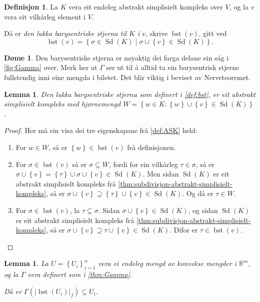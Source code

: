 \documentclass[a4paper, 12pt, norsk]{article}
\theoremstyle{plain}
\newtheorem{lemma}[theorem]{Lemma}
\theoremstyle{definition}
\newtheorem{definition}[theorem]{Definisjon}
\newtheorem{example}[theorem]{Døme}
\newcommand{\Rb}{\mathbb{R}}
\newcommand{\union}{ \mathop{\cup}\limits }
\newcommand{\gr}[1]{ \lvert #1 \rvert } %
\newcommand{\set}[1]{ \left\{ #1 \right\} } %
\DeclareMathOperator{\Sd}{Sd} %
\DeclareMathOperator{\bst}{bst} %
\begin{document}
\begin{definition} \label{def:bst}
	La \( K \) vera eit endeleg abstrakt simplisielt kompleks over \( V \), og la \( v \) vera eit vilkårleg element i \( V \).
	
	Då er \emph{den lukka barysentriske stjerna til \( K \) i \( v \)}, skrive \( \bst(v) \), gitt ved
	\[
		\bst(v) = \set{\sigma \in \Sd(K) \mid \sigma \union \set{v} \in \Sd(K)}.
	\]
\end{definition}

\begin{example}
	Den barysentriske stjerna er nøyaktig dei farga delane ein såg i \autoref{fig:Gamma} over. Merk her at \( \Gamma \) ser ut til å alltid ta ein barysentrisk stjerne fullstendig inni eine mengda i biletet. Det blir viktig i beviset av Nerveteoremet.
\end{example}

\begin{lemma} \label{thm:bst-ask}
	Den lukka barysentriske stjerna som definert i \autoref{def:bst}, er eit abstrakt simplisielt kompleks med hjørnemengd \( W = \set{w \in K : \set{w} \union \set{v} \in \Sd(K)} \).
\end{lemma}

\begin{proof}
	Her må ein visa dei tre eigenskapane frå \autoref{def:ASK} held:
	\begin{enumerate}
		\item{For \( w \in W \), så er \( \set{w} \in \bst(v) \) frå definisjonen.}
  		\item{For \( \sigma \in \bst(v) \) så er \( \sigma \subseteq W \), fordi for ein vilkårleg \( \tau \in \sigma \), så er \( \sigma \union \set{v} = \set{\tau} \union \sigma \union \set{v} \in \Sd(K) \). Men sidan \( \Sd(K) \) er eit abstrakt simplisielt kompleks frå \autoref{thm:subdivisjon-abstrakt-simplisielt-kompleks}, så er \( \sigma \union \set{v} \supseteq \set{\tau} \union \set{v} \in \Sd(K) \). Og då er \( \tau \in W \).}
    	\item{For \( \sigma \in \bst(v) \), la \( \tau \subseteq \sigma \). Sidan \( \sigma \union \set{v} \in \Sd(K) \), og sidan \( \Sd(K) \) er eit abstrakt simplisielt kompleks frå \autoref{thm:subdivisjon-abstrakt-simplisielt-kompleks}, så er \( \sigma \union \set{v} \supseteq \tau \union \set{v} \in \Sd(K) \). Difor er \( \tau \in \bst(v) \).}
	\end{enumerate}
\end{proof}

\begin{lemma} \label{thm:Gamma-inni-ui}
	La \( U = \set{U_i}_{i=1}^n \) vera ei endeleg mengd av konvekse mengder i \( \Rb^m \), og la \( \Gamma \) vera definert som i \autoref{thm:Gamma}.

	Då er \( \Gamma(\gr{\bst(U_i)}_f) \subseteq U_i \).
\end{lemma}
\end{document}
